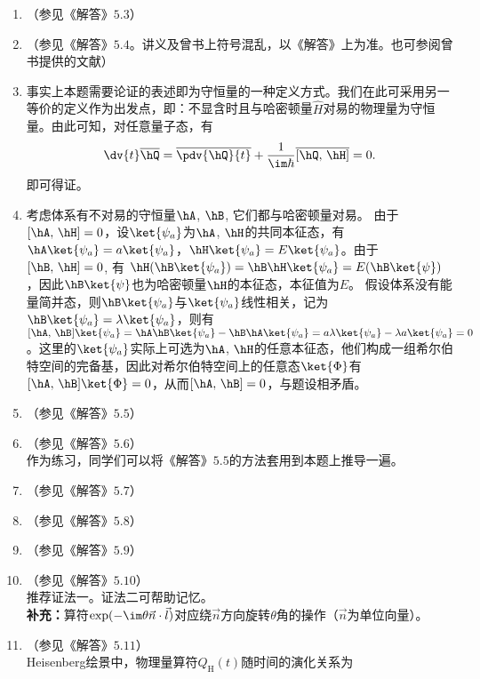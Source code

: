 \begin{enumerate}[label=\textbf{3.\arabic*}]
\item
（参见《解答》$5.3$）

\item
（参见《解答》$5.4$。讲义及曾书上符号混乱，以《解答》上为准。也可参阅曾书提供的文献\cite{14}）

\item 事实上本题需要论证的表述即为守恒量的一种定义方式。我们在此可采用另一等价的定义作为出发点，即：不显含时且与哈密顿量$\hat{H}$对易的物理量为守恒量。由此可知，对任意量子态，有
\[\dv{t} \overline{\hQ} = \overline{\pdv{\hQ}{t}} + \frac{1}{\im\hbar}\overline{[\hQ,\,\hH]} = 0.\]
即可得证。

\item 考虑体系有不对易的守恒量$\hA$, $\hB$, 它们都与哈密顿量对易。
由于$[\hA,\,\hH]=0$，设$\ket{\psi_a}$为$\hA$, $\hH$的共同本征态，有$\hA\ket{\psi_a}=a\ket{\psi_a}$，$\hH\ket{\psi_a} = E\ket{\psi_a}$。由于$[\hB,\,\hH]=0$, 有
$\hH(\hB\ket{\psi_a})=\hB\hH\ket{\psi_a} = E(\hB\ket{\psi})$，因此$\hB\ket{\psi}$也为哈密顿量$\hH$的本征态，本征值为$E$。 假设体系没有能量简并态，则$\hB\ket{\psi_a}$与$\ket{\psi_a}$线性相关，记为$\hB\ket{\psi_a}=\lambda\ket{\psi_a}$，则有$[\hA,\,\hB]\ket{\psi_a} = \hA\hB\ket{\psi_a}-\hB\hA\ket{\psi_a} = a \lambda \ket{\psi_a}-\lambda a \ket{\psi_a} = 0$。这里的$\ket{\psi_a}$实际上可选为$\hA$, $\hH$的任意本征态，他们构成一组希尔伯特空间的完备基，因此对希尔伯特空间上的任意态$\ket{\Phi}$有$[\hA,\,\hB]\ket{\Phi}=0$，从而$[\hA,\,\hB]=0$，与题设相矛盾。

\item
（参见《解答》$5.5$）

\item
（参见《解答》$5.6$）\\
作为练习，同学们可以将《解答》$5.5$的方法套用到本题上推导一遍。

\item
（参见《解答》$5.7$）

\item
（参见《解答》$5.8$）

\item
（参见《解答》$5.9$）

\item
（参见《解答》$5.10$）\\
推荐证法一。证法二可帮助记忆。\\
\textbf{补充：}算符$\exp(-\im\theta\vec{n}\cdot\vec{l})$对应绕$\vec{n}$方向旋转$\theta$角的操作（$\vec{n}$为单位向量）。

\item
（参见《解答》$5.11$）\\
Heisenberg绘景中，物理量算符$Q_\mathrm{H}(t)$随时间的演化关系为


\end{enumerate}
